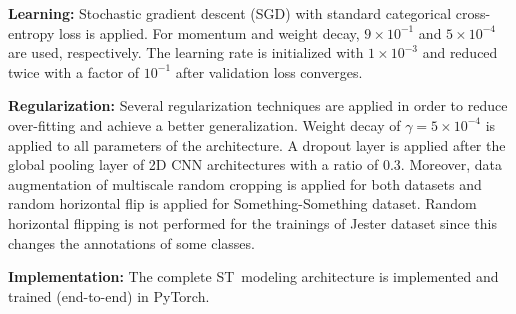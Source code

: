 \documentclass[runningheads]{llncs}
\begin{document}
\textbf{Learning:} Stochastic gradient descent (SGD) with standard categorical cross-entropy loss is applied. For momentum and weight decay, $9 \times 10^{-1}$ and $5 \times 10^{-4}$ are used, respectively. The learning rate is initialized with $1 \times 10^{-3}$ and reduced twice with a factor of $10^{-1}$ after validation loss converges. 


\textbf{Regularization:} Several regularization techniques are applied in order to reduce over-fitting and achieve a better generalization. Weight decay of $\gamma = 5 \times 10^{-4}$ is applied to all parameters of the architecture. A dropout layer is applied after the global pooling layer of 2D CNN architectures with a ratio of $0.3$. Moreover, data augmentation of multiscale random cropping is applied for both datasets and random horizontal flip is applied for Something-Something dataset. Random horizontal flipping is not performed for the trainings of Jester dataset since this changes the annotations of some classes.  

\textbf{Implementation:} The complete ST~modeling architecture is implemented and trained (end-to-end) in PyTorch. 
\end{document}
